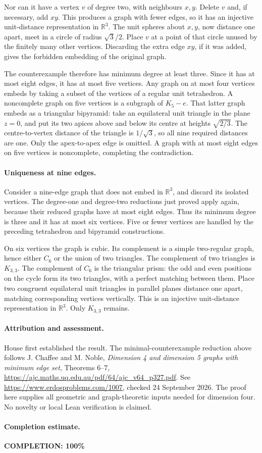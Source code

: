 Nor can it have a vertex \(v\) of degree two, with neighbours \(x,y\). Delete \(v\) and, if necessary, add \(xy\). This produces a graph with fewer edges, so it has an injective unit-distance representation in \(\mathbb R^3\). The unit spheres about \(x,y\), now distance one apart, meet in a circle of radius \(\sqrt3/2\). Place \(v\) at a point of that circle unused by the finitely many other vertices. Discarding the extra edge \(xy\), if it was added, gives the forbidden embedding of the original graph.

The counterexample therefore has minimum degree at least three. Since it has at most eight edges, it has at most five vertices. Any graph on at most four vertices embeds by taking a subset of the vertices of a regular unit tetrahedron. A noncomplete graph on five vertices is a subgraph of \(K_5-e\). That latter graph embeds as a triangular bipyramid: take an equilateral unit triangle in the plane \(z=0\), and put its two apices above and below its centre at heights \(\sqrt{2/3}\). The centre-to-vertex distance of the triangle is \(1/\sqrt3\), so all nine required distances are one. Only the apex-to-apex edge is omitted. A graph with at most eight edges on five vertices is noncomplete, completing the contradiction.

\paragraph{Uniqueness at nine edges.}
Consider a nine-edge graph that does not embed in \(\mathbb R^3\), and discard its isolated vertices. The degree-one and degree-two reductions just proved apply again, because their reduced graphs have at most eight edges. Thus its minimum degree is three and it has at most six vertices. Five or fewer vertices are handled by the preceding tetrahedron and bipyramid constructions.

On six vertices the graph is cubic. Its complement is a simple two-regular graph, hence either \(C_6\) or the union of two triangles. The complement of two triangles is \(K_{3,3}\). The complement of \(C_6\) is the triangular prism: the odd and even positions on the cycle form its two triangles, with a perfect matching between them. Place two congruent equilateral unit triangles in parallel planes distance one apart, matching corresponding vertices vertically. This is an injective unit-distance representation in \(\mathbb R^3\). Only \(K_{3,3}\) remains.

\paragraph{Attribution and assessment.}
House first established the result. The minimal-counterexample reduction above follows J. Chaffee and M. Noble, \emph{Dimension 4 and dimension 5 graphs with minimum edge set}, Theorems 6--7, \url{https://ajc.maths.uq.edu.au/pdf/64/ajc_v64_p327.pdf}. See \url{https://www.erdosproblems.com/1007}, checked 24 September 2026. The proof here supplies all geometric and graph-theoretic inputs needed for dimension four. No novelty or local Lean verification is claimed.

\paragraph{Completion estimate.}
\textbf{COMPLETION: 100\%}
